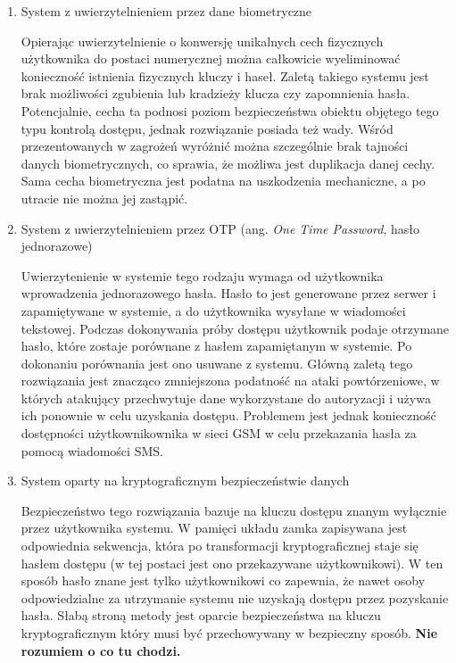 \begin{enumerate}[label=\Alph*.]
			\item System z uwierzytelnieniem przez dane biometryczne

				Opierając uwierzytelnienie o konwersję unikalnych cech fizycznych użytkownika do postaci numerycznej można całkowicie wyeliminować konieczność istnienia fizycznych kluczy i haseł. Zaletą takiego systemu jest brak możliwości zgubienia lub kradzieży klucza czy zapomnienia hasła. Potencjalnie, cecha ta podnosi poziom bezpieczeństwa obiektu objętego tego typu kontrolą dostępu, jednak rozwiązanie posiada też wady. Wśród przezentowanych w \cite{biometric-system-vulnerabilities} zagrożeń wyróżnić można szczególnie brak tajności danych biometrycznych, co sprawia, że możliwa jest duplikacja danej cechy. Sama cecha biometryczna jest podatna na uszkodzenia mechaniczne, a po utracie nie można jej zastąpić.

			\item System z uwierzytelnieniem przez OTP (ang. \textit{One Time Password}, hasło jednorazowe)

				Uwierzytenienie w systemie tego rodzaju wymaga od użytkownika wprowadzenia jednorazowego hasła. Hasło to jest generowane przez serwer i zapamiętywane w systemie, a do użytkownika wysyłane w wiadomości tekstowej. Podczas dokonywania próby dostępu użytkownik podaje otrzymane hasło, które zostaje porównane z hasłem zapamiętanym w systemie. Po dokonaniu porównania jest ono usuwane z systemu. Główną zaletą tego rozwiązania jest znacząco zmniejszona podatność na ataki powtórzeniowe, w których atakujący przechwytuje dane wykorzystane do autoryzacji i używa ich ponownie w celu uzyskania dostępu. Problemem jest jednak konieczność dostępności użytkownikownika w sieci GSM w celu przekazania hasła za pomocą wiadomości SMS.

			\item System oparty na kryptograficznym bezpieczeństwie danych

				Bezpieczeństwo tego rozwiązania bazuje na kluczu dostępu znanym wyłącznie przez użytkownika systemu. W pamięci układu zamka zapisywana jest odpowiednia sekwencja, która po transformacji kryptograficznej staje się hasłem dostępu (w tej postaci jest ono przekazywane użytkownikowi). W ten sposób hasło znane jest tylko użytkownikowi co zapewnia, że nawet osoby odpowiedzialne za utrzymanie systemu nie uzyskają dostępu przez pozyskanie hasła. Słabą stroną metody jest oparcie bezpieczeństwa na kluczu kryptograficznym który musi być przechowywany w bezpieczny sposób. \textbf{Nie rozumiem o co tu chodzi.}


\end{enumerate}
